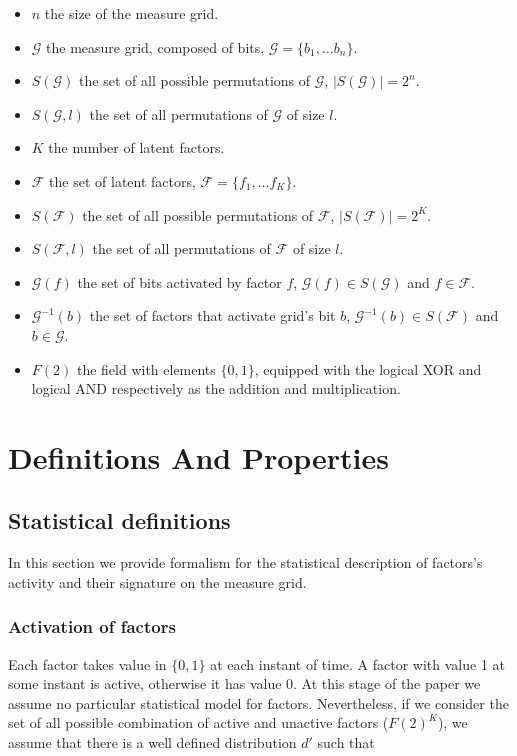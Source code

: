 \documentclass[a4paper, 11pt]{article}
\begin{document}
\begin{itemize}
\item $n$ the size of the measure grid. 
\item $\mathcal{G}$ the measure grid, composed of bits, $\mathcal{G} = \lbrace b_1, \ldots b_n \rbrace$.
\item $S(\mathcal{G})$  the set of all possible permutations of $\mathcal{G}$, $\vert S(\mathcal{G})\vert = 2^{n}$.
\item $S(\mathcal{G}, l)$  the set of all permutations of $\mathcal{G}$ of size $l$.
\item $K$ the number of latent factors.
\item $\mathcal{F}$ the set of latent factors, $\mathcal{F} = \lbrace f_1, \ldots f_K \rbrace$.
\item $S(\mathcal{F})$  the set of all possible permutations of $\mathcal{F}$, $\vert S(\mathcal{F})\vert = 2^{K}$.
\item $S(\mathcal{F}, l)$  the set of all permutations of $\mathcal{F}$ of size $l$.
\item $\mathcal{G}(f)$  the set of bits activated by factor $f$, $\mathcal{G}(f) \in S(\mathcal{G})$ and $f \in \mathcal{F}$.  
\item $\mathcal{G}^{-1}(b)$  the set of factors that activate grid's bit $b$, $\mathcal{G}^{-1}(b) \in S(\mathcal{F})$ and $b \in \mathcal{G}$.
\item $F(2)$ the field with elements $\{0, 1\}$, equipped with the logical XOR and logical AND respectively as the addition and multiplication.
\end{itemize}

  
\section{Definitions And Properties}

\subsection{Statistical definitions}

In this section we provide formalism for the statistical description of factors's activity and their signature on the measure grid.

\subsubsection*{Activation of factors}

Each factor takes value in $\{ 0, 1\}$ at each instant of time. A factor with value 1 at some instant is active, otherwise it has value 0. At this stage of the paper we assume no particular statistical model for factors. Nevertheless, if we consider the set of all possible combination of active and unactive factors ($F(2)^{K}$), we assume that there is a well defined distribution $d'$ such that 
\end{document}
